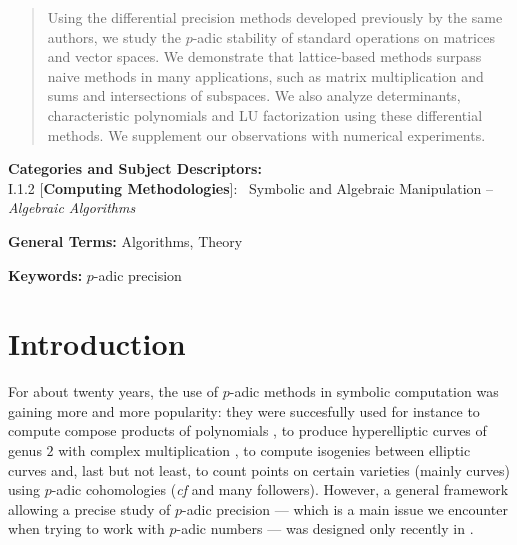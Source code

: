 \documentclass{sig-alternate}
\begin{document}
\begin{abstract}
Using the differential precision methods developed previously by the same authors,
we study the $p$-adic stability of standard operations on matrices and vector 
spaces. We demonstrate that lattice-based methods surpass naive methods in many
applications, such as matrix multiplication and sums and intersections of subspaces.
We also analyze determinants, characteristic polynomials and LU factorization using these differential methods.
We supplement our observations with numerical experiments.
\end{abstract}

\vspace{1mm}
 \noindent
 {\bf Categories and Subject Descriptors:} \\
\noindent I.1.2 [{\bf Computing Methodologies}]:{~} Symbolic and Algebraic
  Manipulation -- \emph{Algebraic Algorithms}

 \vspace{1mm}
 \noindent
 {\bf General Terms:} Algorithms, Theory

 \vspace{1mm}
 \noindent
 {\bf Keywords:} $p$-adic precision
\medskip

\section{Introduction}

For about twenty years, the use of $p$-adic methods in symbolic 
computation was gaining more and more popularity: they were succesfully 
used for instance 
to compute compose products of polynomials 
\cite{boston-gonzalez-perdry-schost:05a}, 
to produce hyperelliptic curves of genus $2$ with complex multiplication 
\cite{gaudry-houtmann-weng-ritzenthaler-kohel:06a},
to compute isogenies between elliptic curves \cite{lercier-sirvent:08a} 
and, last but not least,
to count points on certain varieties (mainly curves) using $p$-adic 
cohomologies (\emph{cf} \cite{kedlaya:01a,lauder:04a} and many
followers).
However, a general framework allowing a precise study of $p$-adic 
precision --- which is a main issue we encounter when trying to work 
with $p$-adic numbers --- was designed only recently in 
\cite{caruso-roe-vaccon:14a}. 

\end{document}
